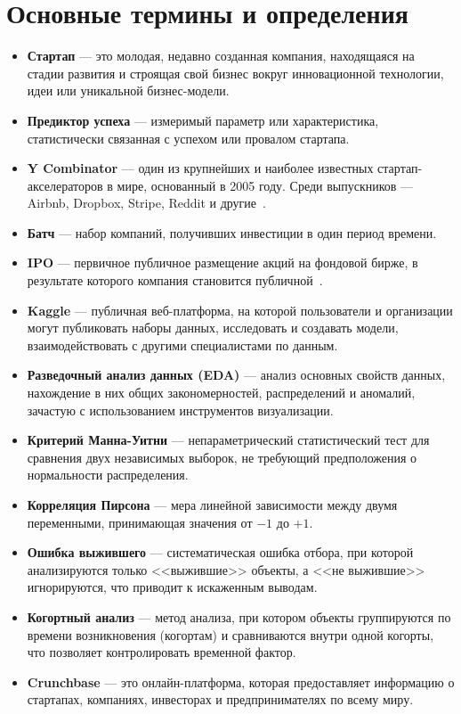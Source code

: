 \section{Основные термины и определения}
\begin{itemize}
    \item \textbf{Стартап} --- это молодая, недавно созданная компания, находящаяся на стадии развития и строящая свой бизнес вокруг инновационной технологии, идеи или уникальной бизнес-модели.~\cite{vtbstartup}
    \item \textbf{Предиктор успеха} --- измеримый параметр или характеристика, статистически связанная с успехом или провалом стартапа.
    \item \textbf{Y Combinator} --- один из крупнейших и наиболее известных стартап-акселераторов в мире, основанный в 2005 году. Среди выпускников --- Airbnb, Dropbox, Stripe, Reddit и другие~\cite{ycombinator}.
    \item \textbf{Батч} --- набор компаний, получивших инвестиции в один период времени.
    \item \textbf{IPO} --- первичное публичное размещение акций на фондовой бирже, в результате которого компания становится публичной~\cite{ipo}.
    \item \textbf{Kaggle} --- публичная веб-платформа, на которой пользователи и организации могут публиковать наборы данных, исследовать и создавать модели, взаимодействовать с другими специалистами по данным.~\cite{wikikaggle}
    \item \textbf{Разведочный анализ данных (EDA)} --- анализ основных свойств данных, нахождение в них общих закономерностей, распределений и аномалий, зачастую с использованием инструментов визуализации.~\cite{wikiEDA}
    \item \textbf{Критерий Манна-Уитни} --- непараметрический статистический тест для сравнения двух независимых выборок, не требующий предположения о нормальности распределения.~\cite{mann-whitney}
    \item \textbf{Корреляция Пирсона} --- мера линейной зависимости между двумя переменными, принимающая значения от $-1$ до $+1$.~\cite{pearson-corr}
    \item \textbf{Ошибка выжившего} --- систематическая ошибка отбора, при которой анализируются только <<выжившие>> объекты, а <<не выжившие>> игнорируются, что приводит к искаженным выводам.
    \item \textbf{Когортный анализ} --- метод анализа, при котором объекты группируются по времени возникновения (когортам) и сравниваются внутри одной когорты, что позволяет контролировать временной фактор.
    \item \textbf{Crunchbase} --- это онлайн-платформа, которая предоставляет информацию о стартапах, компаниях, инвесторах и предпринимателях по всему миру.~\cite{getinvestor}
\end{itemize}
